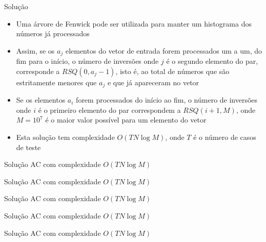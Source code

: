 \begin{frame}[fragile]{Solução}

    \begin{itemize}
        \item Uma árvore de Fenwick pode ser utilizada para manter um histograma dos
            números já processados

        \item Assim, se os $a_j$ elementos do vetor de entrada forem processados um a um, do fim
            para o início, o número de inversões onde $j$ é o segundo elemento do par, 
            corresponde a $RSQ(0, a_j - 1)$, isto é, ao total de números que são estritamente
            menores que $a_j$ e que já apareceram no vetor

        \item Se os elementos $a_i$ forem processados do início ao fim, o número de inversões onde
            $i$ é o primeiro elemento do par correspondem a $RSQ(i + 1, M)$, onde $M = 10^7$
            é o maior valor possível para um elemento do vetor

        \item Esta solução tem complexidade $O(TN\log M)$, onde $T$ é o número de casos de teste

   \end{itemize}

\end{frame}

\begin{frame}[fragile]{Solução AC com complexidade $O(TN\log M)$}
\end{frame}

\begin{frame}[fragile]{Solução AC com complexidade $O(TN\log M)$}
\end{frame}

\begin{frame}[fragile]{Solução AC com complexidade $O(TN\log M)$}
\end{frame}

\begin{frame}[fragile]{Solução AC com complexidade $O(TN\log M)$}
\end{frame}

\begin{frame}[fragile]{Solução AC com complexidade $O(TN\log M)$}
\end{frame}
